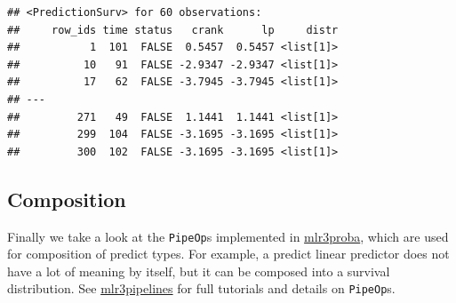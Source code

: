 \documentclass[
]{scrbook}
\newenvironment{Shaded}{\begin{snugshade}}{\end{snugshade}}
\newcommand{\AttributeTok}[1]{\textcolor[rgb]{0.77,0.63,0.00}{#1}}
\newcommand{\FloatTok}[1]{\textcolor[rgb]{0.00,0.00,0.81}{#1}}
\newcommand{\FunctionTok}[1]{\textcolor[rgb]{0.00,0.00,0.00}{#1}}
\newcommand{\NormalTok}[1]{#1}
\newcommand{\OtherTok}[1]{\textcolor[rgb]{0.56,0.35,0.01}{#1}}
\newcommand{\SpecialCharTok}[1]{\textcolor[rgb]{0.00,0.00,0.00}{#1}}
\newcommand{\StringTok}[1]{\textcolor[rgb]{0.31,0.60,0.02}{#1}}
\renewenvironment{Shaded} {\begin{snugshade}\small} {\end{snugshade}}
\begin{document}
\begin{Shaded}
\end{Shaded}

\begin{verbatim}
## <PredictionSurv> for 60 observations:
##     row_ids time status   crank      lp     distr
##           1  101  FALSE  0.5457  0.5457 <list[1]>
##          10   91  FALSE -2.9347 -2.9347 <list[1]>
##          17   62  FALSE -3.7945 -3.7945 <list[1]>
## ---                                              
##         271   49  FALSE  1.1441  1.1441 <list[1]>
##         299  104  FALSE -3.1695 -3.1695 <list[1]>
##         300  102  FALSE -3.1695 -3.1695 <list[1]>
\end{verbatim}

\hypertarget{composition}{%
\subsection{Composition}\label{composition}}

Finally we take a look at the \texttt{PipeOp}s implemented in \href{https://mlr3proba.mlr-org.com}{mlr3proba}, which are used for composition of predict types.
For example, a predict linear predictor does not have a lot of meaning by itself, but it can be composed into a survival distribution.
See \href{https://mlr3pipelines.mlr-org.com}{mlr3pipelines} for full tutorials and details on \texttt{PipeOp}s.
\end{document}
